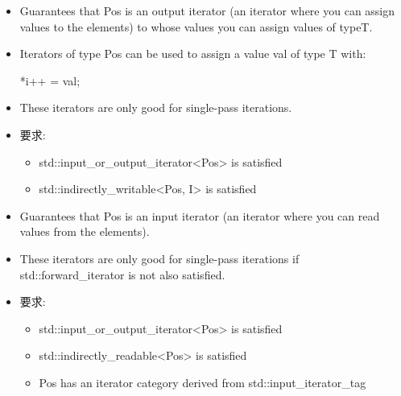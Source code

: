 
\begin{itemize}
\item
Guarantees that Pos is an output iterator (an iterator where you can assign values to the elements) to whose values you can assign values of typeT.

\item
Iterators of type Pos can be used to assign a value val of type T with:

\begin{cpp}
*i++ = val;
\end{cpp}

\item
These iterators are only good for single-pass iterations.

\item
要求:
\begin{itemize}
\item
std::input\_or\_output\_iterator<Pos> is satisfied

\item
std::indirectly\_writable<Pos, I> is satisfied
\end{itemize}
\end{itemize}


\begin{itemize}
\item
Guarantees that Pos is an input iterator (an iterator where you can read values from the elements).

\item
These iterators are only good for single-pass iterations if std::forward\_iterator is not also satisfied.

\item
要求:
\begin{itemize}
\item
std::input\_or\_output\_iterator<Pos> is satisfied

\item
std::indirectly\_readable<Pos> is satisfied

\item
Pos has an iterator category derived from std::input\_iterator\_tag
\end{itemize}
\end{itemize}


